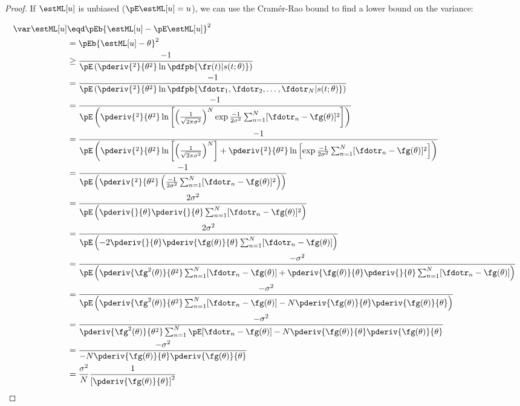 {\begin{proof}
If $\estML[u]$ is unbiased ($\pE\estML[u]= u $), we can use
the Cram\'er-Rao bound to find a lower bound on the variance:

\begin{align*}
   \var\estML[u]
     &\eqd \pEb{\estML[u]-\pE\estML[u]}^2
   \\&= \pEb{\estML[u]-\theta}^2
   \\&\ge \frac{-1}{\pE\left(
              \pderiv{^2}{\theta^2} \ln \pdfpb{\fr(t)|s(t;\theta)}
           \right)}
   \\&=   \frac{-1}{\pE\left(
              \pderiv{^2}{\theta^2} \ln
              \pdfpb{\fdotr_1, \fdotr_2,\ldots,\fdotr_N|s(t;\theta)}
           \right)}
   \\&=   \frac{-1}{\pE\left(
              \pderiv{^2}{\theta^2} \ln\left[
              \left(\frac{1}{\sqrt{2\pi\sigma^2}} \right)^N
              \exp{\frac{-1}{2\sigma^2}\sum_{n=1}^N [\fdotr_n-\fg(\theta)]^2 }\right]
           \right)}
   \\&=   \frac{-1}{\pE\left(
              \pderiv{^2}{\theta^2} \ln\left[
              \left(\frac{1}{\sqrt{2\pi\sigma^2}} \right)^N \right]
              +
              \pderiv{^2}{\theta^2} \ln\left[
              \exp{\frac{-1}{2\sigma^2}\sum_{n=1}^N [\fdotr_n-\fg(\theta)]^2 }\right]
           \right)}
  \\&=   \frac{-1}{\pE\left(
             \pderiv{^2}{\theta^2}
             \left(\frac{-1}{2\sigma^2}\sum_{n=1}^N [\fdotr_n-\fg(\theta)]^2 \right)
          \right)}
  \\&=   \frac{2\sigma^2}{\pE\left(
             \pderiv{}{\theta} \pderiv{}{\theta}
             \sum_{n=1}^N [\fdotr_n-\fg(\theta)]^2
          \right)}
  \\&=   \frac{2\sigma^2}{\pE\left(
             -2\pderiv{}{\theta}
             \pderiv{\fg(\theta)}{\theta}
             \sum_{n=1}^N [\fdotr_n-\fg(\theta)]
          \right)}
  \\&=   \frac{-\sigma^2}{\pE\left(
             \pderiv{\fg^2(\theta)}{\theta^2}
             \sum_{n=1}^N [\fdotr_n-\fg(\theta)]
             +
             \pderiv{\fg(\theta)}{\theta}
             \pderiv{}{\theta}
             \sum_{n=1}^N [\fdotr_n-\fg(\theta)]
          \right)}
   \\&=   \frac{-\sigma^2}{\pE\left(
              \pderiv{\fg^2(\theta)}{\theta^2}
              \sum_{n=1}^N [\fdotr_n-\fg(\theta)]
              -N
              \pderiv{\fg(\theta)}{\theta}
              \pderiv{\fg(\theta)}{\theta}
           \right)}
   \\&=   \frac{-\sigma^2}{
              \pderiv{\fg^2(\theta)}{\theta^2}
              \sum_{n=1}^N \pE[\fdotr_n-\fg(\theta)]
              -N
              \pderiv{\fg(\theta)}{\theta}
              \pderiv{\fg(\theta)}{\theta}
           }
   \\&=   \frac{-\sigma^2}{
              -N
              \pderiv{\fg(\theta)}{\theta}
              \pderiv{\fg(\theta)}{\theta}
           }
   \\&=   \frac{\sigma^2}{N}
           \frac{1}{\left[ \pderiv{\fg(\theta)}{\theta} \right]^2}
\end{align*}


\end{proof}}
